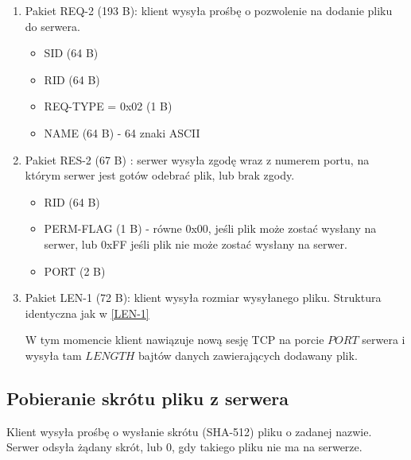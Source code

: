 \documentclass{article}
\begin{document}
	\begin{enumerate}
		\item Pakiet REQ-2 \label{REQ-2} (193 B): klient wysyła prośbę o pozwolenie na dodanie pliku do serwera. 
		\begin{itemize}
			\item SID (64 B)
			\item RID (64 B)
			\item REQ-TYPE = 0x02 (1 B)
			\item NAME (64 B) - 64 znaki ASCII
		\end{itemize}
	
		\item Pakiet RES-2 \label{RES-2} (67 B) : serwer wysyła zgodę wraz z numerem portu, na którym serwer jest gotów odebrać plik, lub brak zgody. 
		\begin{itemize}
			\item RID (64 B)
			\item PERM-FLAG (1 B) - równe 0x00, jeśli plik może zostać wysłany na serwer, lub 0xFF jeśli plik nie może zostać wysłany na serwer. 
			\item PORT (2 B) 
		\end{itemize}
	
		\item Pakiet LEN-1 (72 B): klient wysyła rozmiar wysyłanego pliku. Struktura identyczna jak w \ref{LEN-1}
	
		W tym momencie klient nawiązuje nową sesję TCP na porcie $PORT$ serwera i wysyła tam $LENGTH$ bajtów danych zawierających dodawany plik. 

	\end{enumerate}

	\subsection{Pobieranie skrótu pliku z serwera}
	Klient wysyła prośbę o wysłanie skrótu (SHA-512) pliku o zadanej nazwie. Serwer odsyła żądany skrót, lub 0, gdy takiego pliku nie ma na serwerze. 
	
\end{document}
